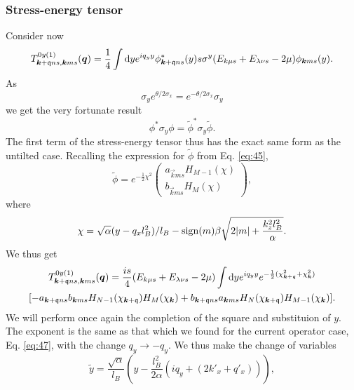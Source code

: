 \subsubsection{Stress-energy tensor}
Consider now
\begin{equation}
  \label{eq:33}
  T_{\bm{k} + \mathfrak{q} n s, \bm{k} m s}^{0y(1)} (\bm{q}) =
  \frac{1}{4}
  \int \mathrm{d} y
  e^{i q_{y} y}
  \phi ^{*}_{\bm{k} + \mathfrak{q} n s}(y) s \sigma ^{y}
  (E_{k \mu  s} + E_{\lambda \nu s} - 2 \mu)
  \phi _{\bm{k} m s} (y).
\end{equation}
As
\begin{equation}
  \label{eq:34}
  \sigma _{y} e^{\theta /2 \sigma _{x}} = e^{-\theta /2 \sigma _{x}} \sigma _{y}
\end{equation}
we get the very fortunate result
\begin{equation}
  \label{eq:35}
  \phi^{*} \sigma _{y} \phi = \tilde{\phi}^{*} \sigma _{y} \tilde{\phi}.
\end{equation}
The first term of the stress-energy tensor thus has the exact same form as the untilted case.
Recalling the expression for \(\tilde{\phi}\) from Eq. \eqref{eq:45},
\[
  \tilde{\phi} = e^{-\frac{1}{2} \chi ^2}
  \begin{pmatrix}
    a_{\vec{k} m s} H_{M-1} (\chi)\\
    b_{\vec{k} m s} H_{M} (\chi)
  \end{pmatrix},
\]
where
\[
\chi = \sqrt{\alpha} (y - q_{x} l_{B}^2 ) /l_{B} - \operatorname{sign}(m) \beta \sqrt{2 |m| + \frac{k_{z}^2 l_{B}^2}{\alpha }}.
\]
We thus get
\begin{multline}
  \label{eq:48}
  T_{\vec{k}+\qvec{q} ns, \vec{k} m s}^{0y (1)} (\vec{q}) =
  \frac{is}{4} (E_{k\mu  s} + E_{\lambda \nu s} - 2 \mu)
  \int \mathrm{d} y
  e^{i q_{y} y}
  e^{-\frac{1}{2} (\chi_{\vec{k}+\qvec{q}}^2 + \chi_{\vec{k}} ^2) }\\
  [
  -a_{\vec{k} + \qvec{q} ns} b_{\vec{k} m s} H_{N-1} (\chi_{\vec{k} + \qvec{q}}) H_{M} (\chi_{\vec{k}})
  + b_{\vec{k} + \qvec{q} n s} a_{\vec{k} ms} H_{N}(\chi_{\vec{k} + \qvec{q}}) H_{M-1} (\chi_{\vec{k}})
  ].
\end{multline}
We will perform once again the completion of the square and substituion of \(y\).
The exponent is the same as that which we found for the current operator case, Eq. \eqref{eq:47}, with the change \(q_{y} \to - q_{y}\).
We thus make the change of variables
\begin{equation}
  \label{eq:49}
  \tilde{y} = \frac{\sqrt{\alpha}}{l_{B}} \left(y  - \frac{l_{B}^2}{2 \alpha } (i q_{y} + (2k' _x + q' _x) )\right),
\end{equation}
